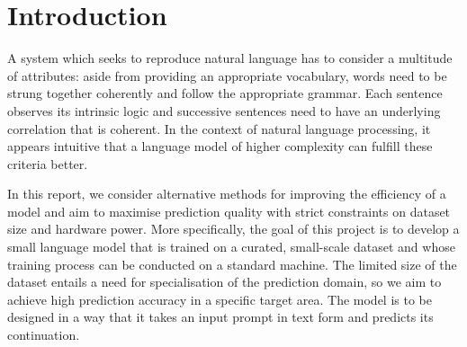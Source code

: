 \documentclass[11pt]{article}
\begin{document}
    \maketitlepage

    \begin{abstract}
        This report explores strategies for enhancing the efficiency of natural
	    language processing under constraints of limited training data and
	    computational resources. Traditionally, “bigger” language models, i.e. models
	    with more parameters produce better predictions than their smaller counterparts.
	    This approach of scaling up models usually involves large datasets and powerful
	    hardware, both of which can be expensive. The aim of this report is to analyse
        methods of optimisation that create a powerful model while requiring less data and processing power.
        This quality-over-quantity approach calls for high-caliber data in a distinct area.
        The dataset chosen for this work is the TinyStories corpus by Eldan and Li which is advantageous
        due to its fusion of diversification and linguistic simplicity.
        Among the optimisation techniques used in the model training process are thorough
        data preprocessing, a custom-made tokeniser and a curriculum learning agenda.
        In this report, these techniques are described and analysed with respect to
        their influence on training efficiency. In addition, the evaluation pipeline used in this process is demonstrated and justified.
        Our findings indicate that when designing a language model, size is not the only factor that can raise prediction quality and by implementing various optimisation techniques, small language models can generate remarkably coherent text.


    \end{abstract}

    \section{Introduction}
    A system which seeks to reproduce natural language has to consider a multitude of attributes:
    aside from providing an appropriate vocabulary, words need to be strung together coherently and follow the appropriate
    grammar.
    Each sentence observes its intrinsic logic and successive sentences need to have an underlying correlation that is coherent.
    In the context of natural language processing, it appears intuitive that a language model of higher complexity can fulfill these criteria better.

	In this report, we consider alternative methods for improving the efficiency
	of a model and aim to maximise prediction quality with strict constraints on
	dataset size and hardware power.
    More specifically, the goal of this project
	is to develop a small language model that is trained on a curated,
	small-scale dataset and whose training process can be conducted on a
	standard machine. The limited size of the dataset entails a need for
	specialisation of the prediction domain, so we aim to achieve high
	prediction accuracy in a specific target area. The model is to be designed in a way that it takes an input prompt in text form and predicts its continuation.
\end{document}
